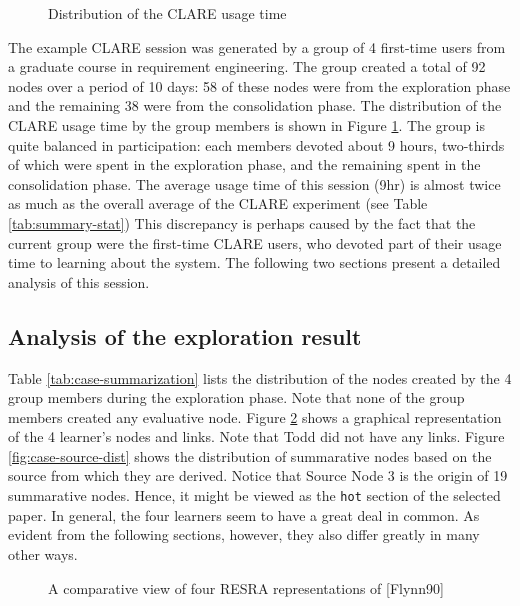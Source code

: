 \begin{figure}[hbtp]
 \caption{Distribution of the CLARE usage time}
 \label{fig:case-usage-time}
\end{figure}

The example CLARE session was generated by a group of 4 first-time users
from a graduate course in requirement engineering. The group created a
total of 92 nodes over a period of 10 days: 58 of these nodes were from the
exploration phase and the remaining 38 were from the consolidation phase.
The distribution of the CLARE usage time by the group members is shown in
Figure \ref{fig:case-usage-time}. The group is quite balanced in
participation: each members devoted about 9 hours, two-thirds of which were
spent in the exploration phase, and the remaining spent in the
consolidation phase. The average usage time of this session (9hr) is almost
twice as much as the overall average of the CLARE experiment (see Table
\ref{tab:summary-stat}) This discrepancy is perhaps caused by the fact that
the current group were the first-time CLARE users, who devoted part of
their usage time to learning about the system. The following two sections
present a detailed analysis of this session.


\subsection{Analysis of the exploration result}

Table \ref{tab:case-summarization} lists the distribution of the nodes
created by the 4 group members during the exploration phase. Note that none
of the group members created any evaluative node. Figure
\ref{fig:rep-phase1} shows a graphical representation of the 4 learner's
nodes and links. Note that Todd did not have any links. Figure
\ref{fig:case-source-dist} shows the distribution of summarative nodes
based on the source from which they are derived. Notice that Source Node 3
is the origin of 19 summarative nodes. Hence, it might be viewed as the
{\tt hot} section of the selected paper. In general, the four learners seem
to have a great deal in common. As evident from the following sections,
however, they also differ greatly in many other ways.

\begin{figure}[hbtp]
 \caption{A comparative view of four RESRA representations of [Flynn90]}
  \label{fig:rep-phase1}
\end{figure}

